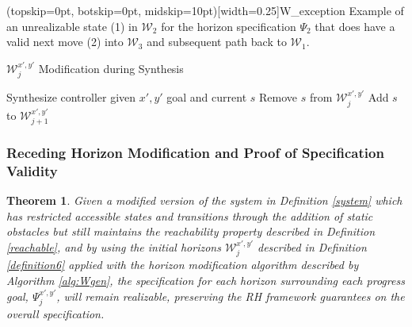 \documentclass{ieeeaccess}
\newtheorem{theorem}{Theorem}
\begin{document}
\Figure[t!](topskip=0pt, botskip=0pt, midskip=10pt)[width=0.25\textwidth]{W_exception}
{Example of an unrealizable state (1) in $\mathcal{W}_2$ for the horizon specification $\Psi_{2}$ that does have a valid next move (2) into $\mathcal{W}_3$ and subsequent path back to $\mathcal{W}_1$.\label{horizon_case}}

\begin{algorithm}
	\caption{$\mathcal{W}^{x',y'}_j$ Modification during Synthesis}\label{alg:Wgen}
	\begin{algorithmic}[1]
		\State Synthesize controller given $x',y'$ goal and current $s$
		\State Remove $s$ from $\mathcal{W}_j^{x',y'}$
		\State Add $s$ to $\mathcal{W}_{j+1}^{x',y'}$
		\EndIf
		\EndFor
		\EndFor
		\EndProcedure
	\end{algorithmic}
\end{algorithm}	

\subsubsection{Receding Horizon Modification and Proof of Specification Validity}

\begin{theorem}
	Given a modified version of the system in Definition \ref{system} which has restricted accessible states and transitions through the addition of static obstacles but still maintains the \textit{reachability} property described in Definition \ref{reachable}, and by using the initial horizons $\mathcal{W}^{x',y'}_j$ described in Definition \ref{definition6} applied with the horizon modification algorithm described by Algorithm \ref{alg:Wgen}, the specification for each horizon surrounding each progress goal, $\Psi_{j}^{x',y'}$, will remain realizable, preserving the RH framework guarantees on the overall specification.
\end{theorem}
\end{document}
